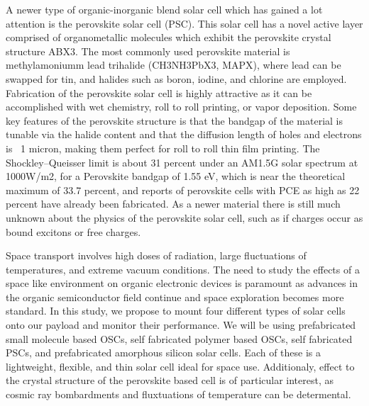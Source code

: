 A newer type of organic-inorganic blend solar cell which has gained a lot  attention is the perovskite solar cell (PSC). This solar cell has a novel active layer comprised of organometallic molecules which exhibit the perovskite crystal structure ABX3. The most commonly used perovskite material is methylamoniumm lead trihalide (CH3NH3PbX3, MAPX), where lead can be swapped for tin, and halides such as boron, iodine, and chlorine are employed. Fabrication of the perovskite solar cell is highly attractive as it can be accomplished with wet chemistry, roll to roll printing, or vapor deposition. Some key features of the perovskite structure is that the bandgap of the material is tunable via the halide content and that the diffusion length of holes and electrons is ~1 micron, making them perfect for roll to roll thin film printing. The Shockley–Queisser limit is about 31 percent under an AM1.5G solar spectrum at 1000W/m2, for a Perovskite bandgap of 1.55 eV, which is near the theoretical maximum of 33.7 percent, and reports of perovskite cells with PCE as high as 22 percent have already been fabricated. As a newer material there is still much unknown about the physics of the perovskite solar cell, such as if charges occur as bound excitons or free charges.

Space transport involves high doses of radiation, large fluctuations of temperatures, and extreme vacuum conditions. The need to study the effects of a space like environment on organic electronic devices is paramount as advances in the organic semiconductor field continue and space exploration becomes more standard. In this study, we propose to mount four different types of solar cells onto our payload and monitor their performance. We will be using prefabricated small molecule based OSCs, self fabricated polymer based OSCs, self fabricated PSCs, and prefabricated amorphous silicon solar cells. Each of these is a lightweight, flexible, and thin solar cell ideal for space use. Additionaly, effect to the crystal structure of the perovskite based cell is of particular interest, as cosmic ray bombardments and fluxtuations of temperature can be determental. 
	



